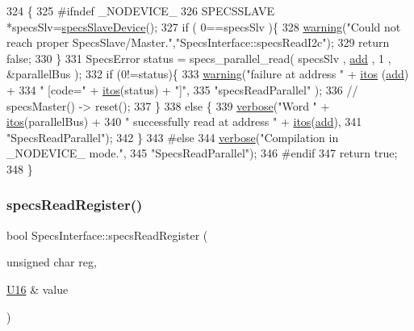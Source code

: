 \begin{DoxyCode}
324                                                       \{
325 \textcolor{preprocessor}{#ifndef \_NODEVICE\_
}
326   SPECSSLAVE *specsSlv=\hyperlink{classSpecsInterface_ac8d4711197f484f055533ec1e5ae01a1}{specsSlaveDevice}();
327   \textcolor{keywordflow}{if} ( 0==specsSlv )\{
328     \hyperlink{classObject_a65cd4fda577711660821fd2cd5a3b4c9}{warning}(\textcolor{stringliteral}{"Could not reach proper SpecsSlave/Master."},\textcolor{stringliteral}{"SpecsInterface::specsReadI2c"});
329     \textcolor{keywordflow}{return} \textcolor{keyword}{false};
330   \}
331   SpecsError status = specs\_parallel\_read( specsSlv , \hyperlink{classAttrib_a235f773af19c900264a190b00a3b4ad7}{add} , 1 , &parallelBus );
332   \textcolor{keywordflow}{if} (0!=status)\{
333     \hyperlink{classObject_a65cd4fda577711660821fd2cd5a3b4c9}{warning}(\textcolor{stringliteral}{"failure at address "} + \hyperlink{Tools_8h_af330027dbdafb9a30768b3613c553e60}{itos} (\hyperlink{classAttrib_a235f773af19c900264a190b00a3b4ad7}{add}) +
334             \textcolor{stringliteral}{" [code="} + \hyperlink{Tools_8h_af330027dbdafb9a30768b3613c553e60}{itos}(status) + \textcolor{stringliteral}{"]"},
335             \textcolor{stringliteral}{"specsReadParallel"} );
336     \textcolor{comment}{//    specsMaster() -> reset();}
337   \}
338   \textcolor{keywordflow}{else} \{
339     \hyperlink{classObject_a83d2db2df682907ea1115ad721c1c4a1}{verbose}(\textcolor{stringliteral}{"Word "} + \hyperlink{Tools_8h_af330027dbdafb9a30768b3613c553e60}{itos}(parallelBus) +
340             \textcolor{stringliteral}{" successfully read at address "} + \hyperlink{Tools_8h_af330027dbdafb9a30768b3613c553e60}{itos}(\hyperlink{classAttrib_a235f773af19c900264a190b00a3b4ad7}{add}),
341             \textcolor{stringliteral}{"SpecsReadParallel"});
342   \}
343 \textcolor{preprocessor}{#else
}
344   \hyperlink{classObject_a83d2db2df682907ea1115ad721c1c4a1}{verbose}(\textcolor{stringliteral}{"Compilation in \_NODEVICE\_ mode."},
345           \textcolor{stringliteral}{"SpecsReadParallel"});
346 \textcolor{preprocessor}{#endif
}
347   \textcolor{keywordflow}{return} \textcolor{keyword}{true};
348 \}
\end{DoxyCode}
\mbox{\label{classSpecsInterface_a87080bb575d1b9d0bb313c48e7d3f59a}} 
\subsubsection{\texorpdfstring{specs\+Read\+Register()}{specsReadRegister()}}
{\footnotesize\ttfamily bool Specs\+Interface\+::specs\+Read\+Register (\begin{DoxyParamCaption}\item[{unsigned char}]{reg,  }\item[{\hyperlink{ICECALv3_8h_adf928e51a60dba0df29d615401cc55a8}{U16} \&}]{value }\end{DoxyParamCaption})}

